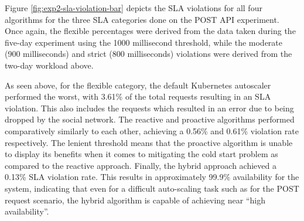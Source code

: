 \begin{center}
\begin{minipage}{\linewidth}
    \label{fig:exp2-sla-violation-bar}
\end{minipage}
\end{center}

Figure \ref{fig:exp2-sla-violation-bar} depicts the SLA violations for all four algorithms for the three SLA categories done on the POST API experiment. Once again, the flexible percentages were derived from the data taken during the five-day experiment using the 1000 millisecond threshold, while the moderate (900 milliseconds) and strict (800 milliseconds) violations were derived from the two-day workload above.\par

As seen above, for the flexible category, the default Kubernetes autoscaler performed the worst, with 3.61\% of the total requests resulting in an SLA violation. This also includes the requests which resulted in an error due to being dropped by the social network. The reactive and proactive algorithms performed comparatively similarly to each other, achieving a 0.56\% and 0.61\% violation rate respectively. The lenient threshold means that the proactive algorithm is unable to display its benefits when it comes to mitigating the cold start problem as compared to the reactive approach. Finally, the hybrid approach achieved a 0.13\% SLA violation rate. This results in approximately 99.9\% availability for the system, indicating that even for a difficult auto-scaling task such as for the POST request scenario, the hybrid algorithm is capable of achieving near ``high availability''.\par

